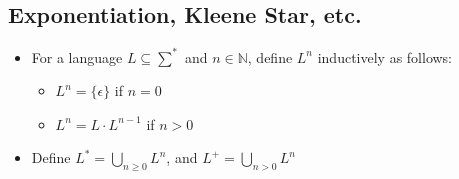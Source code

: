 \subsection{Exponentiation, Kleene Star, etc.}
\begin{itemize}
    \item For a language $L \subseteq \sum^{\ast}$ and $n \in \mathbb{N}$, define $L^n$ inductively as follows:
        \begin{itemize}
            \item $L^n = \{ \epsilon \}$ if $n = 0$
            \item $L^n = L \cdot L^{n - 1}$ if $n > 0$
        \end{itemize}
    \item Define $L^{\ast} = \bigcup_{n \geq 0} L^n$, and $L^+ = \bigcup_{n > 0} L^n$
\end{itemize}
